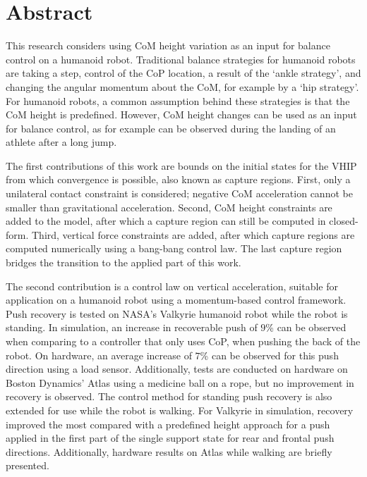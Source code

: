 %
\chapter*{Abstract}%

This research considers using \ac{CoM} height variation as an input for balance control on a humanoid robot. Traditional balance strategies for humanoid robots are taking a step, control of the \ac{CoP} location, a result of the `ankle strategy', and changing the angular momentum about the \ac{CoM}, for example by a `hip strategy'. For humanoid robots, a common assumption behind these strategies is that the \ac{CoM} height is predefined. However, \ac{CoM} height changes can be used as an input for balance control, as for example can be observed during the landing of an athlete after a long jump. 

The first contributions of this work are bounds on the initial states for the \ac{VHIP} from which convergence is possible, also known as capture regions. First, only a unilateral contact constraint is considered; negative \ac{CoM} acceleration cannot be smaller than gravitational acceleration. Second, \ac{CoM} height constraints are added to the model, after which a capture region can still be computed in closed-form. Third, vertical force constraints are added, after which capture regions are computed numerically using a bang-bang control law. The last capture region bridges the transition to the applied part of this work.

The second contribution is a control law on vertical acceleration, suitable for application on a humanoid robot using a momentum-based control framework. Push recovery is tested on NASA's Valkyrie humanoid robot while the robot is standing. In simulation, an increase in recoverable push of $9$\% can be observed when comparing to a controller that only uses \ac{CoP}, when pushing the back of the robot. On hardware, an average increase of $7$\% can be observed for this push direction using a load sensor. Additionally, tests are conducted on hardware on Boston Dynamics' Atlas using a medicine ball on a rope, but no improvement in recovery is observed. The control method for standing push recovery is also extended for use while the robot is walking. For Valkyrie in simulation, recovery improved the most compared with a predefined height approach for a push applied in the first part of the single support state for rear and frontal push directions. Additionally, hardware results on Atlas while walking are briefly presented.